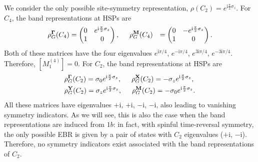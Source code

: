 {We consider the only possible site-symmetry representation, $\rho(C_2)=e^{\mathrm{i} \frac{\pi}{2} \sigma_z}$. 
For $C_4$, the band representations at HSPs are
\begin{equation*}
\begin{aligned}
\rho_G^{\mathbf{\Gamma}}(C_4)&=
\begin{pmatrix}
0 & e^{\mathrm{i} \frac{\pi}{2} \sigma_z}\\
1 & 0
\end{pmatrix}, \hspace*{0.5cm}
\rho_G^{\mathbf{M}}(C_4) &=
\begin{pmatrix}
0 & -e^{\mathrm{i} \frac{\pi}{2} \sigma_z}\\
1 & 0
\end{pmatrix}.
\end{aligned}
\end{equation*}
Both of these matrices have the four eigenvalues $e^{\mathrm{i} \pi/4}$, $e^{-\mathrm{i} \pi/4}$, $e^{3\mathrm{i} \pi/4}$, $e^{-3\mathrm{i} \pi/4}$. Therefore, $[M_1^{(4)}]=0$. For $C_2$, the band representations at HSPs are
\begin{equation}
\begin{aligned}
&\rho_G^{\mathbf{\Gamma}}(C_2)=\sigma_0 e^{\mathrm{i} \frac{\pi}{2} \sigma_z},  \hspace*{0.5cm}
\rho_G^{\mathbf{X}}(C_2)=-\sigma_z e^{\mathrm{i} \frac{\pi}{2} \sigma_z}, \\
&\rho_G^{\mathbf{Y}}(C_2)=\sigma_z e^{\mathrm{i} \frac{\pi}{2} \sigma_z}, \hspace*{0.5cm}
\rho_G^{\mathbf{M}}(C_2)=-\sigma_0 e^{\mathrm{i} \frac{\pi}{2} \sigma_z}. 
\end{aligned}
\end{equation}
All these matrices have eigenvalues $+\mathrm{i}$, $+\mathrm{i}$, $-\mathrm{i}$, $-\mathrm{i}$, also leading to vanishing symmetry indicators. As we will see, this is also the case when the band representations are induced from $1b$: in fact, with spinful time-reversal symmetry, the only possible EBR is given by a pair of states with $C_2$ eigenvalues ($+\mathrm{i}$, $-\mathrm{i}$). Therefore, no symmetry indicators exist associated with the band representations of $C_2$.

}
